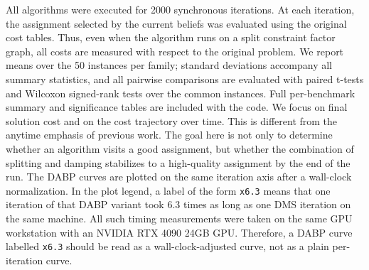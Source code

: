 \documentclass[letterpaper]{article} %
\theoremstyle{definition}
\theoremstyle{remark}
\begin{document}
All algorithms were executed for 2000 synchronous iterations.  At each
iteration, the assignment selected by the current beliefs was evaluated using
the original cost tables.  Thus, even when the algorithm runs on a split
constraint factor graph, all costs are measured with respect to the original
problem.  We report means over the 50 instances per family; standard
deviations accompany all summary statistics, and all pairwise comparisons are
evaluated with paired t-tests and Wilcoxon signed-rank tests over the common
instances.  Full per-benchmark summary and significance tables are included
with the code.
We focus on final solution cost and on the cost trajectory over time.  This is
different from the anytime emphasis of previous work.  The goal here is not
only to determine whether an algorithm visits a good assignment, but whether
the combination of splitting and damping stabilizes to a high-quality assignment
by the end of the run.
The DABP curves are plotted on the same iteration axis after a wall-clock
normalization.  In the plot legend, a label of the form \texttt{x6.3} means that
one iteration of that DABP variant took 6.3 times as long as one DMS iteration
on the same machine.  All such timing measurements were taken on the same
GPU workstation with an NVIDIA RTX 4090 24GB GPU.  Therefore, a DABP curve
labelled \texttt{x6.3} should be read as a wall-clock-adjusted curve, not as a
plain per-iteration curve.
\end{document}
